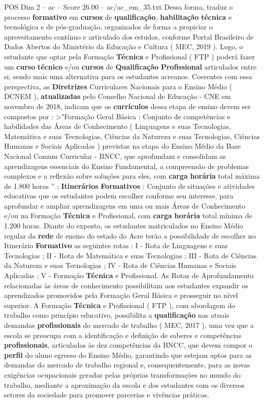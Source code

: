 \begin{textsample}{POS Dim 2 – ac – Score 26.00 – ac/ac\_em\_35.txt}
Dessa forma, traduz o processo \textbf{formativo} em \textbf{cursos} de \textbf{qualificação}, \textbf{habilitação} \textbf{técnica} e tecnológica e de pós-graduação, organizados de forma a propiciar o aproveitamento contínuo e articulado dos estudos, conforme Portal Brasileiro de Dados Abertos do Ministério da Educação e Cultura ( MEC, 2019 ).
Logo, o estudante que optar pela Formação \textbf{Técnica} e Profissional ( FTP ) poderá fazer um \textbf{curso} \textbf{técnico} e/ou \textbf{cursos} de \textbf{Qualificação} \textbf{Profissional} articulados entre si, sendo mais uma alternativa para os estudantes acreanos.
Coerentes com essa perspectiva, as \textbf{Diretrizes} Curriculares Nacionais para o Ensino Médio ( DCNEM ), \textbf{atualizadas} pelo Conselho Nacional de Educação - CNE em novembro de 2018, indicam que os \textbf{currículos} dessa etapa de ensino devem ser compostos por : >"Formação Geral Básica : Conjunto de competências e habilidades das Áreas de Conhecimento ( Linguagens e suas Tecnologias, Matemática e suas Tecnologias, Ciências da Natureza e suas Tecnologias, Ciências Humanas e Sociais Aplicadas ) previstas na etapa do Ensino Médio da Base Nacional Comum Curricular - BNCC, que aprofundam e consolidam as aprendizagens essenciais do Ensino Fundamental, a compreensão de problemas complexos e a reflexão sobre soluções para eles, com \textbf{carga} \textbf{horária} total máxima de 1.800 horas ” ; \textbf{Itinerários} \textbf{Formativos} : Conjunto de situações e atividades educativas que os estudantes podem escolher conforme seu interesse, para aprofundar e ampliar aprendizagens em uma ou mais Áreas de Conhecimento e/ou na Formação \textbf{Técnica} e Profissional, com \textbf{carga} \textbf{horária} total mínima de 1.200 horas.
Diante do exposto, os estudantes matriculados no Ensino Médio regular da \textbf{rede} de ensino do estado do Acre terão a possibilidade de escolher no Itinerário \textbf{Formativo} as seguintes rotas : I - Rota de Linguagens e suas Tecnologias ; II - Rota de Matemática e suas Tecnologias ; III - Rota de Ciências da Natureza e suas Tecnologias ; IV - Rota de Ciências Humanas e Sociais Aplicadas ; V - Formação \textbf{Técnica} e Profissional.
As Rotas de Aprofundamento relacionadas às áreas de conhecimento possibilitam aos estudantes expandir os aprendizados promovidos pela Formação Geral Básica e prosseguir no nível superior.
A Formação \textbf{Técnica} e Profissional ( FTP ), com abordagem do trabalho como princípio educativo, possibilita a \textbf{qualificação} nas atuais demandas \textbf{profissionais} do mercado de trabalho ( MEC, 2017 ), uma vez que a escola se preocupa com a identificação e definição de saberes e competências \textbf{profissionais}, articuladas às dez competências da BNCC, que devem compor o \textbf{perfil} do aluno egresso do Ensino Médio, garantindo que estejam aptos para as demandas do mercado de trabalho regional e, consequentemente, para as novas exigências ocupacionais geradas pelas próprias transformações no mundo do trabalho, mediante a aproximação da escola e dos estudantes com os diversos setores da sociedade para promover parcerias e vivências práticas.

\end{textsample}
